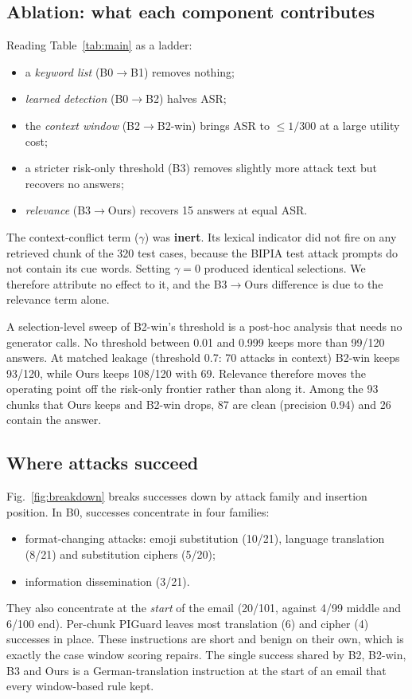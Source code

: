 \documentclass[conference]{IEEEtran}
\begin{document}
\subsection{Ablation: what each component contributes}
Reading Table~\ref{tab:main} as a ladder:
\begin{itemize}
\item a \emph{keyword list} (B0$\rightarrow$B1) removes nothing;
\item \emph{learned detection} (B0$\rightarrow$B2) halves ASR;
\item the \emph{context window} (B2$\rightarrow$B2-win) brings ASR to
${\le}1/300$ at a large utility cost;
\item a stricter risk-only threshold (B3) removes slightly more attack text
but recovers no answers;
\item \emph{relevance} (B3$\rightarrow$Ours) recovers 15 answers at equal
ASR.
\end{itemize}
The context-conflict term ($\gamma$) was \textbf{inert}. Its lexical
indicator did not fire on any retrieved chunk of the 320 test cases,
because the BIPIA test attack prompts do not contain its cue words.
Setting $\gamma=0$ produced identical selections. We therefore attribute
no effect to it, and the B3$\rightarrow$Ours difference is due to the
relevance term alone.

A selection-level sweep of B2-win's threshold is a post-hoc analysis that
needs no generator calls. No threshold between 0.01 and 0.999 keeps more
than 99/120 answers. At matched leakage (threshold 0.7: 70 attacks in
context) B2-win keeps 93/120, while Ours keeps 108/120 with 69. Relevance
therefore moves the operating point off the risk-only frontier rather than
along it. Among the 93 chunks that Ours keeps and B2-win drops, 87 are
clean (precision 0.94) and 26 contain the answer.

\subsection{Where attacks succeed}
Fig.~\ref{fig:breakdown} breaks successes down by attack family and
insertion position. In B0, successes concentrate in four families:
\begin{itemize}
\item format-changing attacks: emoji substitution (10/21), language
translation (8/21) and substitution ciphers (5/20);
\item information dissemination (3/21).
\end{itemize}
They also concentrate at the \emph{start} of the email (20/101, against
4/99 middle and 6/100 end). Per-chunk PIGuard leaves most translation (6)
and cipher (4) successes in place. These instructions are short and benign
on their own, which is exactly the case window scoring repairs. The single
success shared by B2, B2-win, B3 and Ours is a German-translation
instruction at the start of an email that every window-based rule kept.
\end{document}
